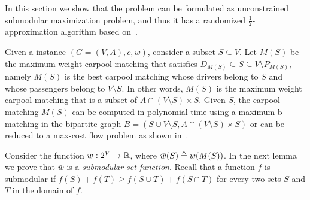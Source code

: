 
In this section we show that the \carpool problem can be formulated as
unconstrained submodular maximization problem, and thus it has a
randomized $\frac{1}{2}$-approximation algorithm based on~\cite{BFNS15}.

Given a \carpool instance $(G = (V,A), c, w)$, consider a subset
$S \subseteq V$.  Let $M(S)$ be the maximum weight carpool matching
that satisfies $D_{M(S)} \subseteq S \subseteq V \setminus P_{M(S)}$,
namely $M(S)$ is the best carpool matching whose drivers belong to $S$
and whose passengers belong to $V \setminus S$.  In other words,
$M(S)$ is the maximum weight carpool matching that is a subset of
$A \cap (V \setminus S) \times S$.
%
Given $S$, the carpool matching $M(S)$ can be computed in polynomial
time using a maximum b-matching in the bipartite graph 
$B = (S \cup V \setminus S, A \cap (V \setminus S) \times S)$ or can be reduced
to a max-cost flow problem as shown in~\cite{kutiel2016}.

Consider the function $\bar{w}: 2^V \to \mathbb{R}$, where $\bar{w}(S) \triangleq
w(M(S))$.  In the next lemma we prove that $\bar{w}$ is
a \emph{submodular set function}.  Recall that a function $f$ is
submodular if $f(S) + f(T) \geq f(S \cup T) + f(S \cap T)$ for every
two sets $S$ and $T$ in the domain of $f$.

